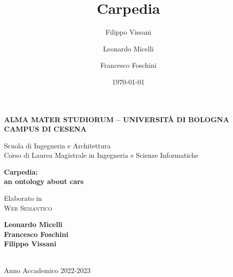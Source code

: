 \title{Carpedia}
\author{Filippo Vissani}
\author{Leonardo Micelli}
\author{Francesco Foschini}
\date{\today}

\begin{titlepage}
	\begin{center}
		
		\large
		\textbf{ALMA MATER STUDIORUM -- UNIVERSITÀ DI BOLOGNA \\ CAMPUS DI CESENA}
		\\
		\noindent\hrulefill
		\vspace{0.4cm}
		
		\Large
		Scuola di Ingegneria e Architettura \\
		Corso di Laurea Magistrale in Ingegneria e Scienze Informatiche
		
		\Huge
		\vspace{4cm}
		\textbf{
			Carpedia:
			\\
			an ontology about cars
		}
		
		\large
		\vspace{1cm}
		Elaborato in 
		\\
		\textsc{Web Semantico}
		
		\vspace{5.5cm}
		\begin{minipage}[t]{0.64\textwidth}
			\begin{flushleft}
				\textbf{Leonardo Micelli}
				\\
				\textbf{Francesco Foschini}
				\\
				\textbf{Filippo Vissani}
			\end{flushleft}
		\end{minipage}
		
		\vfill
		\noindent\hrulefill
		\vspace{0.3cm}
		\Large
		\\
		Anno Accademico 2022-2023
	\end{center}
\end{titlepage}
\restoregeometry
